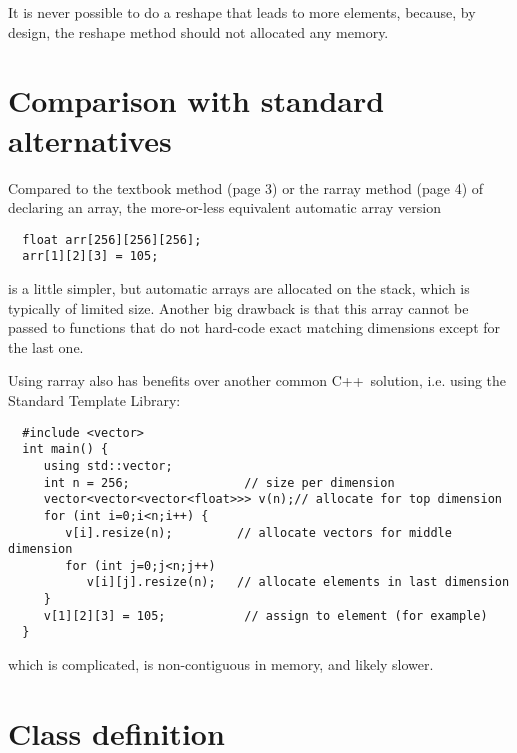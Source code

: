 \documentclass[11pt,twoside]{article}
\newcommand{\cxx}{C{++}}
\begin{document}
It is never possible to do a reshape that leads to more elements,
because, by design, the reshape method should not allocated any
memory.


\section{Comparison with standard alternatives}

Compared to the textbook method (page 3) or the rarray method (page 4)
of declaring an array, the more-or-less equivalent automatic array version 
\vspace{-5pt}\begin{framed}\vspace{-14pt}%
\begin{verbatim}
  float arr[256][256][256]; 
  arr[1][2][3] = 105;
\end{verbatim}
\vspace{-14pt}\end{framed}
\noindent
is a little simpler, but automatic arrays are allocated on the stack,
which is typically of limited size. Another big drawback is that this array cannot be passed to functions that do
not hard-code exact matching dimensions except for the last
one.

Using rarray also has benefits over another common \cxx\ 
solution, i.e. using the Standard Template Library:
\vspace{-5pt}\begin{framed}\vspace{-14pt}%
\begin{verbatim}
  #include <vector>
  int main() {
     using std::vector;
     int n = 256;                // size per dimension
     vector<vector<vector<float>>> v(n);// allocate for top dimension
     for (int i=0;i<n;i++) {
        v[i].resize(n);         // allocate vectors for middle dimension
        for (int j=0;j<n;j++) 
           v[i][j].resize(n);   // allocate elements in last dimension
     }
     v[1][2][3] = 105;           // assign to element (for example)
  }
\end{verbatim}%
\vspace{-14pt}\end{framed}\vspace{-8pt}
\noindent
which is complicated, is non-contiguous in memory, and likely
slower. 

\section{Class definition}
\end{document}
